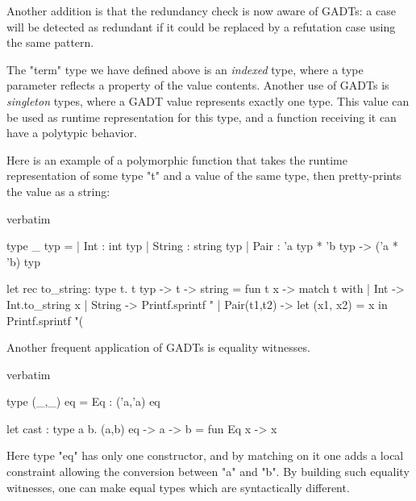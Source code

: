 Another addition is that the redundancy check is now aware of GADTs: a
case will be detected as redundant if it could be replaced by a
refutation case using the same pattern.

The "term" type we have defined above is an {\em indexed} type, where
a type parameter reflects a property of the value contents.
Another use of GADTs is {\em singleton} types, where a GADT value
represents exactly one type. This value can be used as runtime
representation for this type, and a function receiving it can have a
polytypic behavior.

Here is an example of a polymorphic function that takes the
runtime representation of some type "t" and a value of the same type,
then pretty-prints the value as a string:
\begin{camlexample}{verbatim}
\begin{caml}
\begin{camlinput}
type _ typ =
  | Int : int typ
  | String : string typ
  | Pair : 'a typ * 'b typ -> ('a * 'b) typ

let rec to_string: type t. t typ -> t -> string =
  fun t x ->
  match t with
  | Int -> Int.to_string x
  | String -> Printf.sprintf "%
  | Pair(t1,t2) ->
      let (x1, x2) = x in
      Printf.sprintf "(%
\end{camlinput}
\end{caml}
\end{camlexample}

Another frequent application of GADTs is equality witnesses.
\begin{camlexample}{verbatim}
\begin{caml}
\begin{camlinput}
type (_,_) eq = Eq : ('a,'a) eq

let cast : type a b. (a,b) eq -> a -> b = fun Eq x -> x
\end{camlinput}
\end{caml}
\end{camlexample}
Here type "eq" has only one constructor, and by matching on it one
adds a local constraint allowing the conversion between "a" and "b".
By building such equality witnesses, one can make equal types which
are syntactically different.

